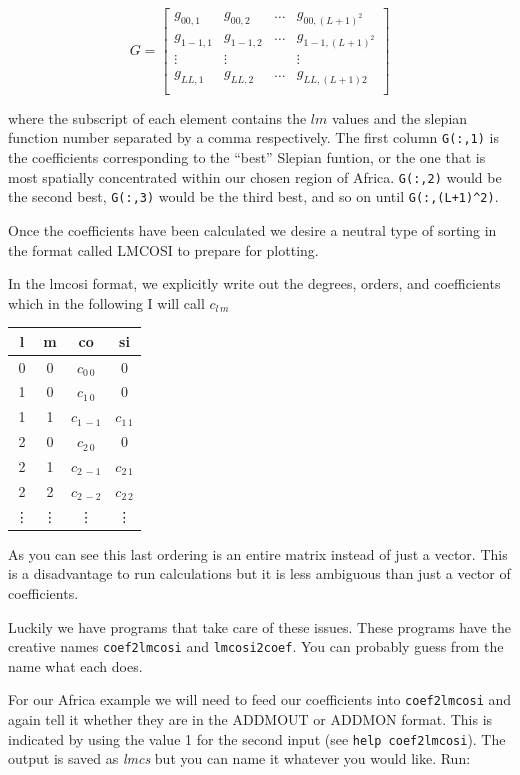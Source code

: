 \documentclass[11pt]{article}
\begin{document}
$$
G = \begin{bmatrix} 
g_{00,1}  & g_{00,2}  & \dots  & g_{00,(L+1)^2}   \\
g_{1-1,1} & g_{1-1,2} & \dots  & g_{1-1,(L+1)^2}  \\
\vdots    & \vdots    &        & \vdots           \\ 
g_{LL,1}  & g_{LL,2}  & \dots  & g_{LL,(L+1)2}    \\  
\end{bmatrix}
$$

where the subscript of each element contains the $lm$ values and the slepian function number separated by a comma respectively. The first column \verb+G(:,1)+ is the coefficients corresponding to the ``best'' Slepian funtion, or the one that is most spatially concentrated within our chosen region of Africa. \verb+G(:,2)+ would be the second best, \verb+G(:,3)+ would be the third best, and so on until \verb|G(:,(L+1)^2)|.
 
Once the coefficients have been calculated we desire a neutral type of sorting in the format called LMCOSI to prepare for plotting.

In the lmcosi format, we explicitly write out the degrees, orders, and coefficients which in the following I will call $c_{l\,m}$

\begin{tabular}{c c c c}
l&m&co&si\\
\hline
0&0&$c_{0\,0}$&0\\
1&0&$c_{1\,0}$&0\\
1&1&$c_{1\,-1}$&$c_{1\,1}$\\
2&0&$c_{2\,0}$&0\\
2&1&$c_{2\,-1}$&$c_{2\,1}$\\
2&2&$c_{2\,-2}$&$c_{2\,2}$\\
\vdots&\vdots&\vdots&\vdots
\end{tabular}

As you can see this last ordering is an entire matrix instead of just a vector. This is a disadvantage to run calculations but it is less ambiguous than just a vector of coefficients.

Luckily we have programs that take care of these issues. These programs have the creative names
\verb+coef2lmcosi+ and \verb+lmcosi2coef+. You can probably guess from the name what each does.

For our Africa example we will need to feed our coefficients into \verb+coef2lmcosi+ and again tell it whether they are in the ADDMOUT or ADDMON format. This is indicated by using the value 1 for the second input (see \verb+help coef2lmcosi+). The output is saved as \textit{lmcs} but you can name it whatever you would like. Run:
\end{document}
